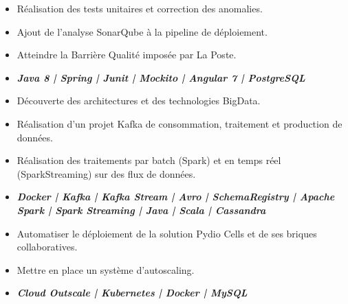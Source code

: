 \divider

\begin{itemize}
\item Réalisation des tests unitaires et correction des anomalies.
\item Ajout de l'analyse SonarQube à la pipeline de déploiement.
\item Atteindre la Barrière Qualité imposée par La Poste.
\item \textbf {\emph{Java 8 | Spring | Junit | Mockito | Angular 7 | PostgreSQL}}

\end{itemize}

\divider

\begin{itemize}
\item Découverte des architectures et des technologies BigData.
\item Réalisation d'un projet Kafka de consommation, traitement et production de données.
\item Réalisation des traitements par batch (Spark) et en temps réel (SparkStreaming) sur des flux de données.
\item \textbf {\emph{Docker | Kafka | Kafka Stream | Avro | SchemaRegistry | Apache Spark | Spark Streaming | Java | Scala | Cassandra}}
\end{itemize}

\divider

\begin{itemize}
\item Automatiser le déploiement de la solution Pydio Cells et de ses briques collaboratives.
\item Mettre en place un système d’autoscaling.
\item \textbf {\emph{Cloud Outscale | Kubernetes | Docker | MySQL}}
\end{itemize}


